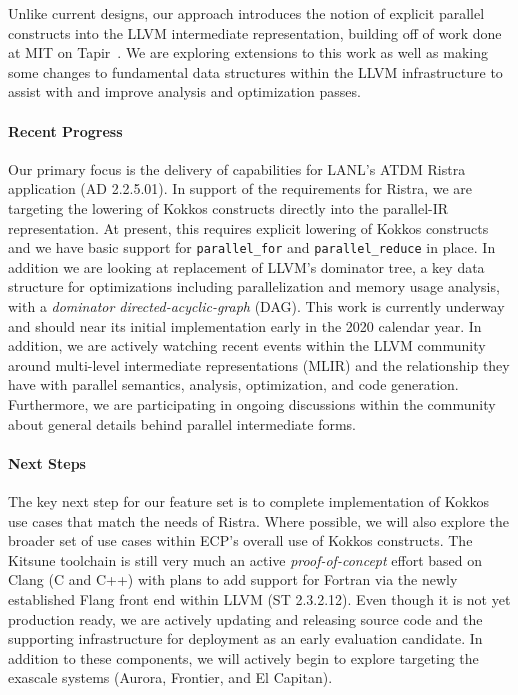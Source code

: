 Unlike current designs, our approach introduces the notion of explicit
parallel constructs into the LLVM intermediate representation, building
off of work done at MIT on Tapir~\cite{2.3.6.01:kitsune:Schardl:2017}. 
We are exploring extensions to this work as well as making some changes
to fundamental data structures within the LLVM infrastructure to assist with
and improve analysis and optimization passes. 

\paragraph{Recent Progress}

Our primary focus is the delivery of capabilities for LANL's ATDM
Ristra application (AD 2.2.5.01).  In support of the requirements for
Ristra, we are targeting the lowering of Kokkos constructs directly
into the parallel-IR representation.  At present, this requires
explicit lowering of Kokkos constructs and we have basic support
for \texttt{parallel\_for} and \texttt{parallel\_reduce} in place.  In
addition we are looking at replacement of LLVM's dominator tree, a key
data structure for optimizations including parallelization and
memory usage analysis, with a \emph{dominator directed-acyclic-graph}
(DAG).  This work is currently underway and should near its initial
implementation early in the 2020 calendar year.  In addition, we are
actively watching recent events within the LLVM community around
multi-level intermediate representations (MLIR) and the relationship
they have with parallel semantics, analysis, optimization, and code
generation.  Furthermore, we are participating in ongoing discussions within the
community about general details behind parallel intermediate forms. 

\paragraph{Next Steps}

The key next step for our feature set is to complete implementation of Kokkos use cases 
that match the needs of Ristra.  Where possible, we will also
explore the broader set of use cases within ECP's overall use of
Kokkos constructs.  The Kitsune toolchain is still very much an
active \emph{proof-of-concept} effort based on Clang (C and C++) with
plans to add support for Fortran via the newly established Flang front
end within LLVM (ST 2.3.2.12).  Even though it is not yet production
ready, we are actively updating and releasing source code and the supporting
infrastructure for deployment as an early evaluation candidate.  In
addition to these components, we will actively begin to explore targeting
the exascale systems (Aurora, Frontier, and El Capitan).

